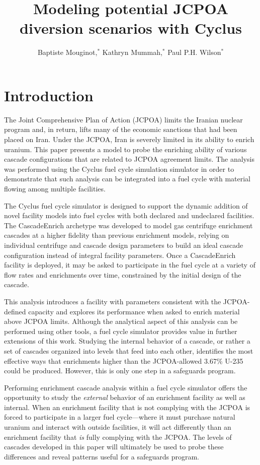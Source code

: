 \documentclass{anstrans}
\title{Modeling potential JCPOA diversion scenarios with Cyclus}
\author{Baptiste Mouginot,$^{*}$ Kathryn Mummah,$^{*}$ Paul P.H. Wilson$^{*}$}
\institute{
$^{*}$University of Wisconsin-Madison, WI
}
\begin{document}
\section{Introduction}

The Joint Comprehensive Plan of Action (JCPOA)\cite{jcpoa} %
limits the Iranian nuclear program and, in return, lifts many of the economic
sanctions that had been placed on Iran. Under the JCPOA, Iran is severely
limited in its ability to enrich uranium. This paper presents a model to probe
the enriching ability of various cascade configurations that are related to
JCPOA agreement limits. The analysis was performed using the Cyclus fuel cycle
\cite{cyclus} %
simulation simulator in order to demonstrate that such analysis can be
integrated into a fuel cycle with material flowing among multiple facilities.

The Cyclus fuel cycle simulator is designed to support the dynamic addition of
novel facility models into fuel cycles with both declared and undeclared facilities.
The CascadeEnrich archetype\cite{mbmore.2018} was developed to model gas centrifuge
enrichment cascades at a higher fidelity than previous enrichment models,
relying on individual centrifuge and cascade design parameters to build an ideal
cascade configuration instead of integral facility parameters. Once a
CascadeEnrich facility is deployed, it may be asked to participate in the fuel
cycle at a variety of flow rates and enrichments over time, constrained by the
initial design of the cascade.

This analysis introduces a facility with parameters consistent with the
JCPOA-defined capacity and explores its performance when asked to enrich
material above JCPOA limits. Although the analytical aspect of this analysis can
be performed using other tools, a fuel cycle simulator provides value in further
extensions of this work. Studying the internal behavior of a cascade, or rather
a set of cascades organized into levels that feed into each other, identifies
the most effective ways that enrichments higher than the JCPOA-allowed 3.67\%
U-235 could be produced. However, this is only one step in a safeguards program.

Performing enrichment cascade analysis within a fuel cycle simulator offers the
opportunity to study the \textit{external} behavior of an enrichment facility as
well as internal. When an enrichment facility that is not complying with the
JCPOA is forced to participate in a larger fuel cycle---where it must purchase
natural uranium and interact with outside facilities, it will act differently
than an enrichment facility that \textit{is} fully complying with the JCPOA. The
levels of cascades developed in this paper will ultimately be used to probe
these differences and reveal patterns useful for a safeguards program.
\end{document}
